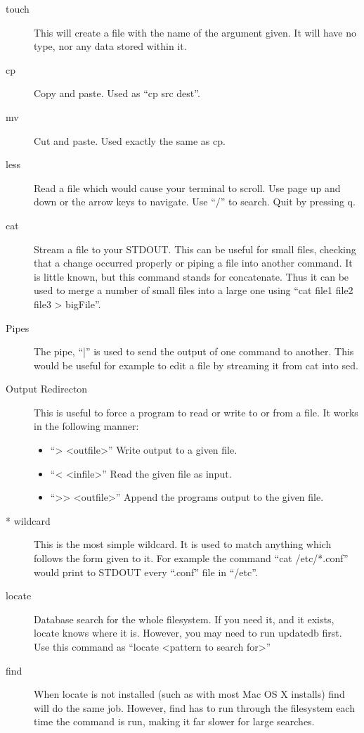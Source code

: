 \begin{description}
			\item[touch]
				This will create a file with the name of the argument given. 
				It will have no type, nor any data stored within it. 
			\item[cp]
				Copy and paste. Used as ``cp src dest''.
			\item[mv]
				Cut and paste. Used exactly the same as cp. 
			\item[less]
				Read a file which would cause your terminal to scroll. 
				Use page up and down or the arrow keys to navigate. 
				Use ``/'' to search.
				Quit by pressing q.
			\item[cat]
				Stream a file to your STDOUT. 
				This can be useful for small files, checking that a change occurred properly or piping a file into another command. 
				It is little known, but this command stands for concatenate. 
				Thus it can be used to merge a number of small files into a large one using ``cat file1 file2 file3 > bigFile''.
			\item[Pipes]
				The pipe, ``|'' is used to send the output of one command to another. 
				This would be useful for example to edit a file by streaming it from cat into sed. 
			\item[Output Redirecton]
				This is useful to force a program to read or write to or from a file. 
				It works in the following manner:
				\begin{itemize}
					\item ``> <outfile>'' Write output to a given file.
					\item ``< <infile>'' Read the given file as input.
					\item ``>{}> <outfile>'' Append the programs output to the given file. 
				\end{itemize}
			\item[\** wildcard]
				This is the most simple wildcard. 
				It is used to match anything which follows the form given to it. 
				For example the command ``cat /etc/\**.conf'' would print to STDOUT every ``.conf'' file in ``/etc''.
			\item[locate]
				Database search for the whole filesystem. 
				If you need it, and it exists, locate knows where it is. 
				However, you may need to run updatedb first. 
				Use this command as ``locate <pattern to search for>''
			\item[find]
				When locate is not installed (such as with most Mac OS X installs) find will do the same job. 
				However, find has to run through the filesystem each time the command is run, making it far slower for large searches. 

\end{description}
